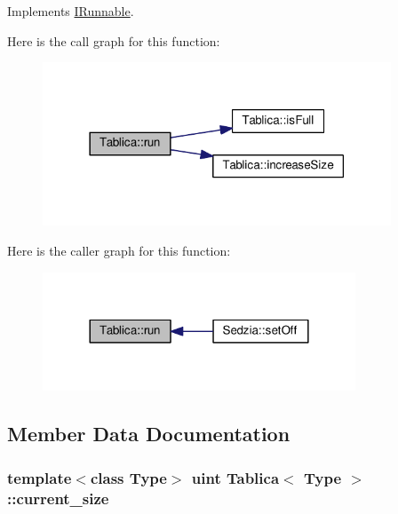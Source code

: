Implements \hyperlink{class_i_runnable_a6566fc2aa9fb5a7136f960172cee918d}{I\-Runnable}.



Here is the call graph for this function\-:
\nopagebreak
\begin{figure}[H]
\begin{center}
\leavevmode
\includegraphics[width=294pt]{class_tablica_a0e9570529b80cc6e1b40bf8b0d7e55c1_cgraph}
\end{center}
\end{figure}




Here is the caller graph for this function\-:
\nopagebreak
\begin{figure}[H]
\begin{center}
\leavevmode
\includegraphics[width=264pt]{class_tablica_a0e9570529b80cc6e1b40bf8b0d7e55c1_icgraph}
\end{center}
\end{figure}




\subsection{Member Data Documentation}
\hypertarget{class_tablica_aa2313b2db3dfda306acaf2a28be00707}{
\subsubsection[{current\-\_\-size}]{\setlength{\rightskip}{0pt plus 5cm}template$<$class Type$>$ {\bf uint} {\bf Tablica}$<$ Type $>$\-::current\-\_\-size\hspace{0.3cm}{\ttfamily [private]}}}\label{class_tablica_aa2313b2db3dfda306acaf2a28be00707}


